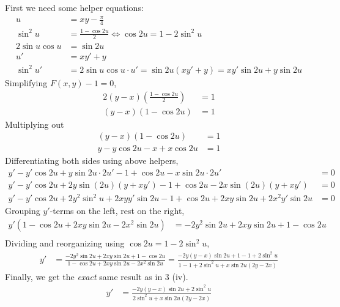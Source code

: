 First we need some helper equations:
\begin{align*}
  u &= xy-\frac{\pi}{4} \\
  \sin^2{u} &= \frac{1-\cos{2u}}{2}
      \iff \cos{2u} = 1 - 2\sin^2{u} \\
  2\sin{u}\cos{u} &= \sin{2u} \\
  u' &= xy' + y \\
  \sin^2{u}' &= 2\sin{u}\cos{u}\cdot u' = \sin{2u}(xy'+y) =
      xy'\sin{2u}+y\sin{2u}
\end{align*}
Simplifying $F(x,y)-1 = 0$,
\begin{align*}
  2(y-x)\left(\frac{1-\cos{2u}}{2}\right) &= 1 \\
  (y-x)(1-\cos{2u}) &= 1
\end{align*}
Multiplying out
\begin{align*}
  (y-x)(1-\cos{2u}) &= 1 \\
  y - y\cos{2u} -x + x\cos{2u} &= 1
\end{align*}
Differentiating both sides using above helpers,
\begin{align*}
  y' - y'\cos{2u} + y\sin{2u}\cdot 2u' - 1 + \cos{2u} - x\sin{2u}\cdot 2u' &= 0 \\
  y' - y'\cos{2u} + 2y\sin{(2u)}(y+xy') - 1 + \cos{2u} - 2x\sin{(2u)}(y+xy') &= 0 \\
  y' - y'\cos{2u} + 2y^2\sin^2{u} + 2xyy'\sin{2u} - 1 + \cos{2u}
    +2xy\sin{2u} + 2x^2y'\sin{2u} &= 0
\end{align*}
Grouping $y'$-terms on the left, rest on the right,
\begin{align*}
  y'\left( 1 - \cos{2u} + 2xy\sin{2u} - 2x^2\sin{2u} \right)
    &= -2y^2\sin{2u} + 2xy\sin{2u} + 1 - \cos{2u} \\
\end{align*}
Dividing and reorganizing using $\cos{2u} = 1 - 2\sin^2{u}$,
\begin{align*}
  y' &= \frac{-2y^2\sin{2u} + 2xy\sin{2u} + 1 - \cos{2u}}
             {1 - \cos{2u} + 2xy\sin{2u} - 2x^2\sin{2u}}
      = \frac{-2y(y-x)\sin{2u} + 1 - 1 + 2\sin^2{u}}
             {1 - 1 + 2\sin^2{u} + x\sin{2u}(2y-2x)}
\end{align*}
Finally, we get the \textit{exact} same result as in 3 (iv).
\begin{align*}
  y' &= \frac{-2y(y-x)\sin{2u} + 2\sin^2{u}}
             {2\sin^2{u} + x\sin{2u}(2y-2x)}
\end{align*}
